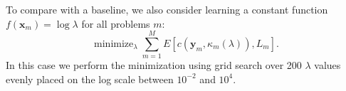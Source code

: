 \documentclass[twoside,11pt]{article}
\DeclareMathOperator*{\minimize}{minimize}
\begin{document}
To compare with a baseline, we also consider learning a constant
function $f(\mathbf x_m)=\log\lambda$ for all problems $m$:
 \begin{equation}
  \label{eq:learn-lambda}
  \minimize_{\lambda}
  \sum_{m=1}^M E\left[
    c(\mathbf y_m, \kappa_m(\lambda)), 
    L_m\right].
\end{equation}
In this case we perform the minimization using grid search over 200 $\lambda$
values evenly placed on the log scale between $10^{-2}$ and $10^{4}$.



\end{document}
